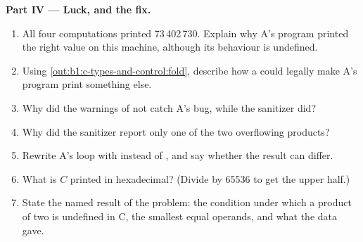 \begin{problem}
\medskip\noindent\textbf{Part IV --- Luck, and the fix.}
\begin{enumerate}[resume]
\item All four computations printed 73\,402\,730. Explain why A's program printed the right value on this machine,
although its behaviour is undefined.
\item Using \cref{out:b1:c-types-and-control:fold}, describe how a  could legally make A's program print
something else.
\item Why did the warnings of  not catch A's bug, while the sanitizer did?
\item Why did the sanitizer report only one of the two overflowing products?
\item Rewrite A's loop with  instead of , and say whether the result can differ.
\item What is $C$ printed in hexadecimal? (Divide by 65536 to get the upper half.)
\item State the named result of the problem: the condition under which a product of two  is
undefined in C, the smallest equal operands, and what the data gave.
\end{enumerate}
\end{problem}
